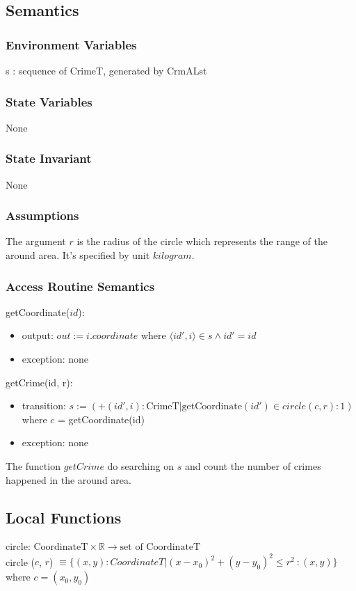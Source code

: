 \documentclass[12pt]{article}
\begin{document}
\subsection* {Semantics}

\subsubsection* {Environment Variables}
s : sequence of CrimeT, generated by CrmALst


\subsubsection* {State Variables}
None

\subsubsection* {State Invariant}
None

\subsubsection* {Assumptions}

The argument $r$ is the radius of the circle which represents the range of the around area. It's specified by unit $kilogram$.

\subsubsection* {Access Routine Semantics}

\noindent getCoordinate($id$):
\begin{itemize}
\item output: $out := i.coordinate$ where $\langle id', i \rangle \in s \wedge id' = id$
\item exception: none
\end{itemize}

\noindent getCrime(id, r):
\begin{itemize}
\item transition: $s := (+ (id', i): \text{CrimeT} | \text{getCoordinate}(id') \in circle(c, r): 1)$ where $c$ = getCoordinate(id)
\item exception: none
\end{itemize}

The function $getCrime$ do searching on $s$ and count the number of crimes happened in the around area.

\subsection*{Local Functions}
\noindent circle: $\text{CoordinateT} \times \mathbb{R} \rightarrow \text{set of CoordinateT}$\\
\noindent circle ($c$, $r$) $\equiv \{(x, y) : CoordinateT | (x - x_0)^2 + (y - y_0)^2 \le r^2\ : (x, y)\} $ where $c = (x_0, y_0)$
\end{document}
